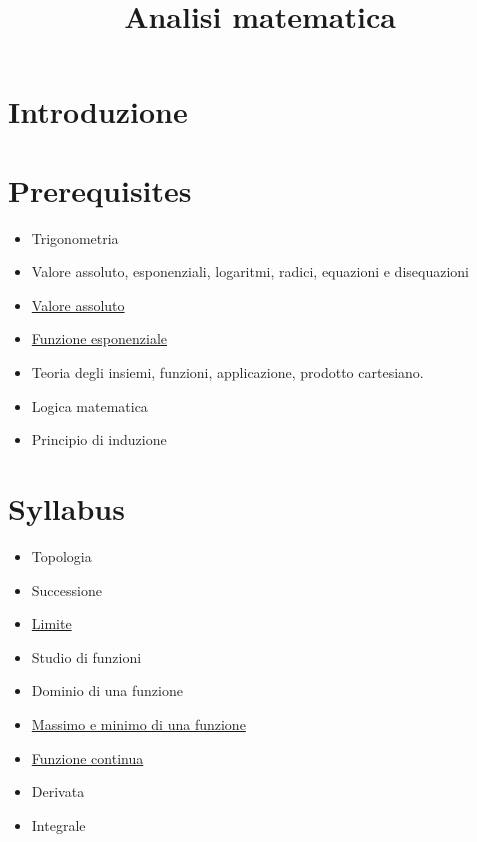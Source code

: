 \documentclass[a4paper,10pt]{article}
\title{Analisi matematica}
\author{}
\begin{document}
\maketitle


\section{Introduzione}

\section{Prerequisites}
\begin{itemize}
 \item Trigonometria
 \item Valore assoluto, esponenziali, logaritmi, radici, equazioni e disequazioni
 \item \href{./ValoreAssoluto.html}{Valore assoluto}
 \item \href{./FunzioneEsponenziale.html}{Funzione esponenziale}
 \item Teoria degli insiemi, funzioni, applicazione, prodotto cartesiano.
 \item Logica matematica
 \item Principio di induzione
\end{itemize}

\section{Syllabus}
\begin{itemize}
 \item Topologia
 \item Successione
 \item \href{Limite.html}{Limite}
 \item Studio di funzioni
 \item Dominio di una funzione
 \item \href{FunzioneMassimoMinimo.html}{Massimo e minimo di una funzione}
 \item \href{FunzioneContinua.html}{Funzione continua}
 \item Derivata
 \item Integrale
\end{itemize}
\end{document}

